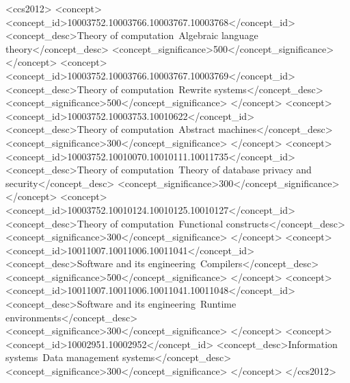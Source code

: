 \documentclass[acmsmall]{acmart}
\begin{document}
\begin{CCSXML}
<ccs2012>
<concept>
<concept_id>10003752.10003766.10003767.10003768</concept_id>
<concept_desc>Theory of computation~Algebraic language theory</concept_desc>
<concept_significance>500</concept_significance>
</concept>
<concept>
<concept_id>10003752.10003766.10003767.10003769</concept_id>
<concept_desc>Theory of computation~Rewrite systems</concept_desc>
<concept_significance>500</concept_significance>
</concept>
<concept>
<concept_id>10003752.10003753.10010622</concept_id>
<concept_desc>Theory of computation~Abstract machines</concept_desc>
<concept_significance>300</concept_significance>
</concept>
<concept>
<concept_id>10003752.10010070.10010111.10011735</concept_id>
<concept_desc>Theory of computation~Theory of database privacy and security</concept_desc>
<concept_significance>300</concept_significance>
</concept>
<concept>
<concept_id>10003752.10010124.10010125.10010127</concept_id>
<concept_desc>Theory of computation~Functional constructs</concept_desc>
<concept_significance>300</concept_significance>
</concept>
<concept>
<concept_id>10011007.10011006.10011041</concept_id>
<concept_desc>Software and its engineering~Compilers</concept_desc>
<concept_significance>500</concept_significance>
</concept>
<concept>
<concept_id>10011007.10011006.10011041.10011048</concept_id>
<concept_desc>Software and its engineering~Runtime environments</concept_desc>
<concept_significance>300</concept_significance>
</concept>
<concept>
<concept_id>10002951.10002952</concept_id>
<concept_desc>Information systems~Data management systems</concept_desc>
<concept_significance>300</concept_significance>
</concept>
</ccs2012>
\end{CCSXML}


%
\end{document}
